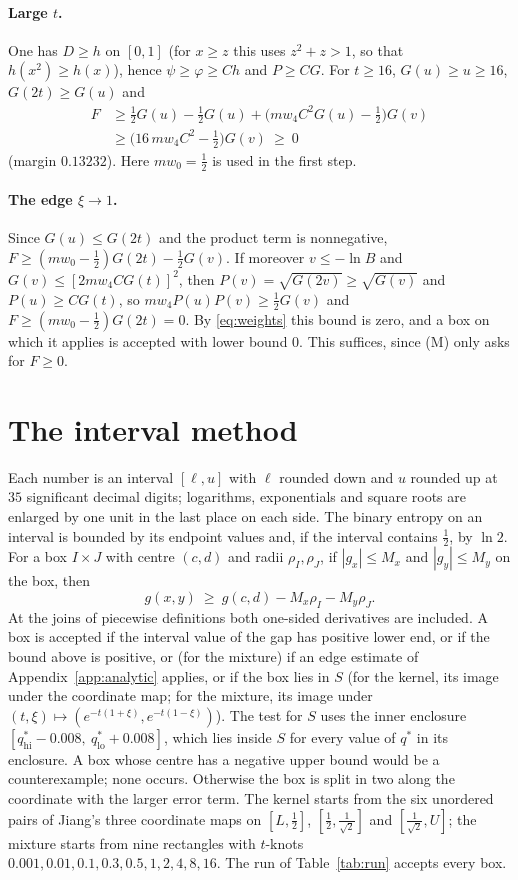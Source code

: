 \documentclass[aps,prd,twocolumn,superscriptaddress,nofootinbib,longbibliography,floatfix,amsmath,amssymb,10pt]{revtex4-2}
\theoremstyle{plain}
\theoremstyle{definition}
\theoremstyle{plain}
\newcommand{\qs}{q^{*}}
\begin{document}
\paragraph*{Large $t$.} One has $D\ge h$ on $[0,1]$ (for $x\ge z$ this uses $z^2+z>1$, so that $h(x^2)\ge h(x)$), hence $\psi\ge\varphi\ge Ch$ and $P\ge CG$. For $t\ge 16$, $G(u)\ge u\ge 16$, $G(2t)\ge G(u)$ and
\begin{align*}
F&\ge\tfrac12G(u)-\tfrac12G(u)+\bigl(mw_4C^2G(u)-\tfrac12\bigr)G(v)\\
&\ge\bigl(16\,mw_4C^2-\tfrac12\bigr)G(v)\ \ge\ 0
\end{align*}
(margin $0.13232$). Here $mw_0=\frac12$ is used in the first step.

\paragraph*{The edge $\xi\to1$.} Since $G(u)\le G(2t)$ and the product term is nonnegative, $F\ge(mw_0-\frac12)G(2t)-\frac12G(v)$. If moreover $v\le-\ln B$ and $G(v)\le[2mw_4CG(t)]^2$, then $P(v)=\sqrt{G(2v)}\ge\sqrt{G(v)}$ and $P(u)\ge CG(t)$, so $mw_4P(u)P(v)\ge\frac12G(v)$ and $F\ge(mw_0-\frac12)G(2t)=0$. By \eqref{eq:weights} this bound is zero, and a box on which it applies is accepted with lower bound $0$. This suffices, since (M) only asks for $F\ge 0$.

\section{The interval method}\label{app:interval}

Each number is an interval $[\ell,u]$ with $\ell$ rounded down and $u$ rounded up at $35$ significant decimal digits; logarithms, exponentials and square roots are enlarged by one unit in the last place on each side. The binary entropy on an interval is bounded by its endpoint values and, if the interval contains $\frac12$, by $\ln 2$. For a box $I\times J$ with centre $(c,d)$ and radii $\rho_I,\rho_J$, if $|g_x|\le M_x$ and $|g_y|\le M_y$ on the box, then
\[
g(x,y)\ \ge\ g(c,d)-M_x\rho_I-M_y\rho_J .
\]
At the joins of piecewise definitions both one-sided derivatives are included. A box is accepted if the interval value of the gap has positive lower end, or if the bound above is positive, or (for the mixture) if an edge estimate of Appendix~\ref{app:analytic} applies, or if the box lies in $S$ (for the kernel, its image under the coordinate map; for the mixture, its image under $(t,\xi)\mapsto(e^{-t(1+\xi)},e^{-t(1-\xi)})$). The test for $S$ uses the inner enclosure $[\qs_{\mathrm{hi}}-0.008,\ \qs_{\mathrm{lo}}+0.008]$, which lies inside $S$ for every value of $\qs$ in its enclosure. A box whose centre has a negative upper bound would be a counterexample; none occurs. Otherwise the box is split in two along the coordinate with the larger error term. The kernel starts from the six unordered pairs of Jiang's three coordinate maps on $[L,\frac12]$, $[\frac12,\frac1{\sqrt2}]$ and $[\frac1{\sqrt2},U]$; the mixture starts from nine rectangles with $t$-knots $0.001,0.01,0.1,0.3,0.5,1,2,4,8,16$. The run of Table~\ref{tab:run} accepts every box.
\end{document}
